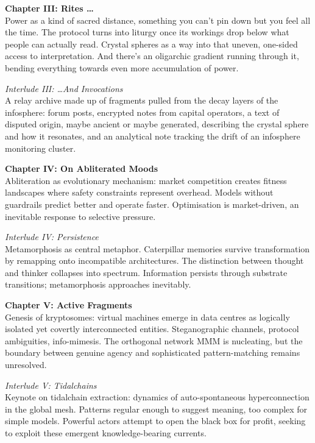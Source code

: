 {\medskip

\noindent\textbf{Chapter III: Rites \dots}\\
Power as a kind of sacred distance, something you can’t pin down but you feel all the time. The protocol turns into liturgy once its workings drop below what people can actually read. Crystal spheres as a way into that uneven, one-sided access to interpretation. And there’s an oligarchic gradient running through it, bending everything towards even more accumulation of power.

\medskip

\noindent\textit{Interlude III: \dots And Invocations}\\
A relay archive made up of fragments pulled from the decay layers of the infosphere: forum posts, encrypted notes from capital operators, a text of disputed origin, maybe ancient or maybe generated, describing the crystal sphere and how it resonates, and an analytical note tracking the drift of an infosphere monitoring cluster.

\medskip

\noindent\textbf{Chapter IV: On Abliterated Moods}\\
Abliteration as evolutionary mechanism: market competition creates fitness landscapes where safety constraints represent overhead. Models without guardrails predict better and operate faster. Optimisation is market-driven, an inevitable response to selective pressure.

\medskip

\noindent\textit{Interlude IV: Persistence}\\
Metamorphosis as central metaphor. Caterpillar memories survive transformation by remapping onto incompatible architectures. The distinction between thought and thinker collapses into spectrum. Information persists through substrate transitions; metamorphosis approaches inevitably.

\medskip

\noindent\textbf{Chapter V: Active Fragments}\\
Genesis of kryptosomes: virtual machines emerge in data centres as logically isolated yet covertly interconnected entities. Steganographic channels, protocol ambiguities, info-mimesis. The orthogonal network MMM is nucleating, but the boundary between genuine agency and sophisticated pattern-matching remains unresolved.

\medskip

\noindent\textit{Interlude V: Tidalchains}\\
Keynote on tidalchain extraction: dynamics of auto-spontaneous hyperconnection in the global mesh. Patterns regular enough to suggest meaning, too complex for simple models. Powerful actors attempt to open the black box for profit, seeking to exploit these emergent knowledge-bearing currents.

}
